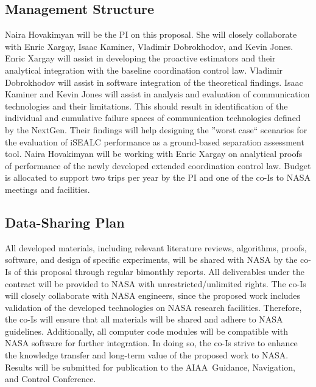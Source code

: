 \documentclass[letter,onecolumn,12pt]{aiaa-tc}
\newcommand{\1}{1_n}
\begin{document}
\subsection{Management Structure}

Naira Hovakimyan will be the PI on this proposal. She will closely collaborate with Enric Xargay, Isaac Kaminer, Vladimir Dobrokhodov, and Kevin Jones. Enric Xargay will assist in developing the proactive estimators and their analytical integration with the baseline coordination control law. Vladimir Dobrokhodov will assist in software integration of the theoretical findings. Isaac Kaminer and Kevin Jones will assist in analysis and evaluation of communication technologies and their limitations. This should result in identification of the individual and cumulative failure spaces of communication technologies defined by the NextGen. Their findings will help designing the ''worst case`` scenarios for the evaluation of iSEALC performance as a ground-based separation assessment tool. Naira Hovakimyan will be working with Enric Xargay on analytical proofs of  performance of the newly developed extended coordination control law. Budget is allocated to support two trips per year by the PI and one of the co-Is to NASA meetings and facilities.

\subsection{Data-Sharing Plan}

All developed materials, including relevant literature reviews, algorithms, proofs, software, and design of specific experiments, will be shared with NASA by the co-Is of this proposal through regular bimonthly reports. All deliverables under the contract will be provided to NASA with unrestricted/unlimited rights. The co-Is will closely collaborate with NASA engineers, since the proposed work includes validation of the developed technologies on NASA research facilities. Therefore, the co-Is will ensure that all materials will be shared and adhere to NASA guidelines. Additionally, all computer code modules will be compatible with NASA software for further integration. In doing so, the co-Is strive to enhance the knowledge transfer and long-term value of the proposed work to NASA. Results will be submitted for publication to the AIAA~Guidance, Navigation, and Control Conference.
\end{document}

